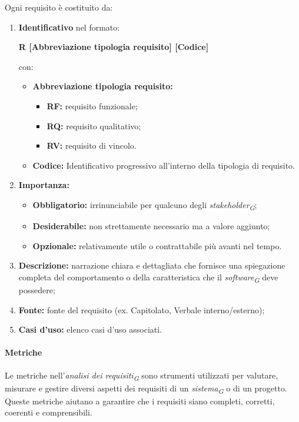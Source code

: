 Ogni requisito è costituito da:
\begin{enumerate}
    \item \textbf{Identificativo} nel formato:\\
    \begin{center}
        \textbf{R [Abbreviazione tipologia requisito] [Codice]}
    \end{center}
    con:
    \begin{itemize}
        \item \textbf{Abbreviazione tipologia requisito:}
            \begin{itemize}
                \item \textbf{RF:} requisito funzionale;
                \item \textbf{RQ:} requisito qualitativo;
                \item \textbf{RV:} requisito di vincolo.
            \end{itemize}
        \item \textbf{Codice:} Identificativo progressivo all'interno della tipologia di requisito.
    \end{itemize}
    \item \textbf{Importanza:}
          \begin{itemize}
              \item \textbf{Obbligatorio:} irrinunciabile per qualcuno degli \textit{stakeholder}\textsubscript{\textit{G}};
              \item \textbf{Desiderabile:} non strettamente necessario ma a valore aggiunto;
              \item \textbf{Opzionale:} relativamente utile o contrattabile più avanti nel tempo.
          \end{itemize}
    \item \textbf{Descrizione:} narrazione chiara e dettagliata che fornisce una spiegazione completa del comportamento o della caratteristica che il \textit{software}\textsubscript{\textit{G}} deve possedere;
    \item \textbf{Fonte:} fonte del requisito (ex. Capitolato, Verbale interno/esterno);
    \item \textbf{Casi d'uso:} elenco casi d'uso associati.
\end{enumerate}

\vspace{0.3cm}

\paragraph{Metriche}
Le metriche nell'\textit{analisi dei requisiti}\textsubscript{\textit{G}} sono strumenti utilizzati per valutare, misurare e gestire diversi aspetti dei requisiti di un \textit{sistema}\textsubscript{\textit{G}} o di un progetto. Queste metriche aiutano a garantire che i requisiti siano completi, corretti, coerenti e comprensibili.

